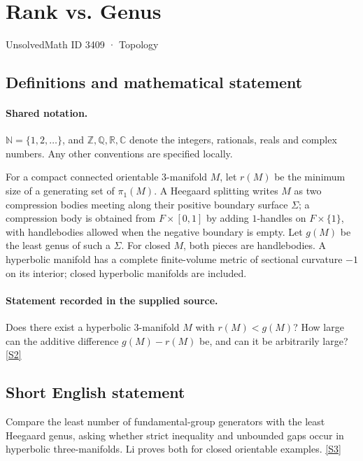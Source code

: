 \documentclass[11pt]{article}
\newcommand{\sref}[2]{\hyperlink{source:#1:#2}{[S#2]}}
\begin{document}
\setcounter{section}{3408}
\section{Rank vs. Genus}\label{3409}
{\small\sffamily UnsolvedMath ID 3409 · Topology}
\subsection{Definitions and mathematical statement}

\paragraph{Shared notation.}$\mathbb N=\{1,2,\ldots\}$, and $\mathbb Z,\mathbb Q,\mathbb R,\mathbb C$ denote the integers, rationals, reals and complex numbers. Any other conventions are specified locally.


For a compact connected orientable $3$-manifold $M$, let $r(M)$ be the minimum size of a generating set of $\pi_1(M)$. A Heegaard splitting writes $M$ as two compression bodies meeting along their positive boundary surface $\Sigma$; a compression body is obtained from $F\times[0,1]$ by adding $1$-handles on $F\times\{1\}$, with handlebodies allowed when the negative boundary is empty. Let $g(M)$ be the least genus of such a $\Sigma$. For closed $M$, both pieces are handlebodies. A hyperbolic manifold has a complete finite-volume metric of sectional curvature $-1$ on its interior; closed hyperbolic manifolds are included.
\paragraph{Statement recorded in the supplied source.}
Does there exist a hyperbolic $3$-manifold $M$ with $r(M)<g(M)$? How large can the additive difference $g(M)-r(M)$ be, and can it be arbitrarily large? \sref{3409}{2}
\subsection{Short English statement}
Compare the least number of fundamental-group generators with the least Heegaard genus, asking whether strict inequality and unbounded gaps occur in hyperbolic three-manifolds. Li proves both for closed orientable examples. \sref{3409}{3}
\end{document}
